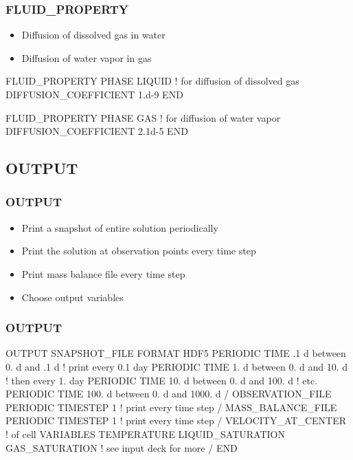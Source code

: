 \documentclass{beamer}
\newcommand\bluecomment[1]{{{\color{blue} #1}}}
\begin{document}
\begin{frame}[fragile]\frametitle{FLUID\_PROPERTY}
\begin{itemize}
  \item Diffusion of dissolved gas in water
  \item Diffusion of water vapor in gas
\end{itemize}

\begin{semiverbatim}

FLUID_PROPERTY
  PHASE LIQUID \bluecomment{! for diffusion of dissolved gas}
  DIFFUSION_COEFFICIENT 1.d-9
END

FLUID_PROPERTY
  PHASE GAS \bluecomment{! for diffusion of water vapor}
  DIFFUSION_COEFFICIENT 2.1d-5
END
\end{semiverbatim}

\end{frame}

\subsection{OUTPUT}

\begin{frame}[fragile]\frametitle{OUTPUT}
\begin{itemize}
  \item Print a snapshot of entire solution periodically
  \item Print the solution at observation points every time step
  \item Print mass balance file every time step
  \item Choose output variables
\end{itemize}

\end{frame}

\begin{frame}[fragile]\frametitle{OUTPUT}

\begin{semiverbatim}\small
OUTPUT
  SNAPSHOT_FILE
    FORMAT HDF5
    PERIODIC TIME .1 d between 0. d and .1 d \bluecomment{! print every 0.1 day}
    PERIODIC TIME 1. d between 0. d and 10. d  \bluecomment{! then every 1. day}
    PERIODIC TIME 10. d between 0. d and 100. d  \bluecomment{! etc.}
    PERIODIC TIME 100. d between 0. d and 1000. d
  /
  OBSERVATION_FILE
    PERIODIC TIMESTEP 1 \bluecomment{! print every time step}
  /
  MASS_BALANCE_FILE
    PERIODIC TIMESTEP 1 \bluecomment{! print every time step}
  /
  VELOCITY_AT_CENTER \bluecomment{! of cell}
  VARIABLES
    TEMPERATURE
    LIQUID_SATURATION
    GAS_SATURATION \bluecomment{! see input deck for more}
  /
END
\end{semiverbatim}

\end{frame}
\end{document}
